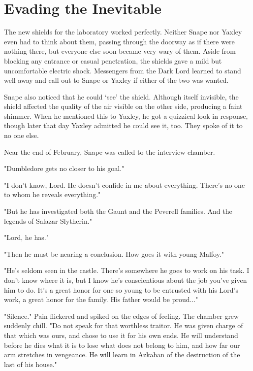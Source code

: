 
\chapter{Evading the Inevitable}

The new shields for the laboratory worked perfectly. Neither Snape nor Yaxley even had to think about them, passing through the doorway as if there were nothing there, but everyone else soon became very wary of them. Aside from blocking any entrance or casual penetration, the shields gave a mild but uncomfortable electric shock. Messengers from the Dark Lord learned to stand well away and call out to Snape or Yaxley if either of the two was wanted.

Snape also noticed that he could `see' the shield. Although itself invisible, the shield affected the quality of the air visible on the other side, producing a faint shimmer. When he mentioned this to Yaxley, he got a quizzical look in response, though later that day Yaxley admitted he could see it, too. They spoke of it to no one else.

Near the end of February, Snape was called to the interview chamber.

"Dumbledore gets no closer to his goal."

"I don't know, Lord. He doesn't confide in me about everything. There's no one to whom he reveals everything."

"But he has investigated both the Gaunt and the Peverell families. And the legends of Salazar Slytherin."

"Lord, he has."

"Then he must be nearing a conclusion. How goes it with young Malfoy."

"He's seldom seen in the castle. There's somewhere he goes to work on his task. I don't know where it is, but I know he's conscientious about the job you've given him to do. It's a great honor for one so young to be entrusted with his Lord's work, a great honor for the family. His father would be proud..."

"Silence." Pain flickered and spiked on the edges of feeling. The chamber grew suddenly chill. "Do not speak for that worthless traitor. He was given charge of that which was ours, and chose to use it for his own ends. He will understand before he dies what it is to lose what does not belong to him, and how far our arm stretches in vengeance. He will learn in Azkaban of the destruction of the last of his house."

